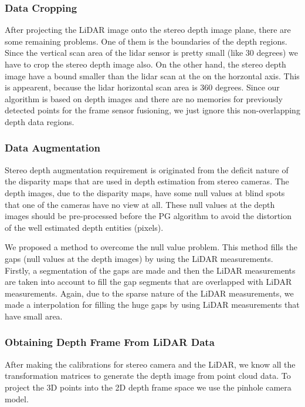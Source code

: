 \documentclass[conference]{IEEEtran}
\begin{document}
\subsubsection{Data Cropping}

After projecting the LiDAR image onto the stereo depth image plane, there are some remaining problems. One of them is the boundaries of the depth regions. Since the vertical scan area of the lidar sensor is pretty small (like 30 degrees) we have to crop the stereo depth image also. On the other hand, the stereo depth image have a bound smaller than the lidar scan at the on the horzontal axis. This is appearent, because the lidar horizontal scan area is 360 degrees. Since our algorithm is based on depth images and there are no memories for previously detected points for the frame sensor fusioning, we just ignore this non-overlapping depth data regions.

\subsubsection{Data Augmentation}

Stereo depth augmentation requirement is originated from the deficit nature of the disparity maps that are used in depth estimation from stereo cameras. The depth images, due to the disparity maps, have some null values at blind spots that one of the cameras have no view at all. These null values at the depth images should be pre-processed before the PG algorithm to avoid the distortion of the well estimated depth entities (pixels).

We proposed a method to overcome the null value problem. This method fills the gaps (null values at the depth images) by using the LiDAR measurements. Firstly, a segmentation of the gaps are made and then the LiDAR measurements are taken into account to fill the gap segments that are overlapped with LiDAR measurements. Again, due to the sparse nature of the LiDAR measurements, we made a interpolation for filling the huge gaps by using LiDAR measurements that have small area. 


\subsubsection{Obtaining Depth Frame From LiDAR Data}

After making the calibrations for stereo camera and the LiDAR, we know all the transformation matrices to generate the depth image from point cloud data. To project the 3D points into the 2D depth frame space we use the pinhole camera model. 
\end{document}
